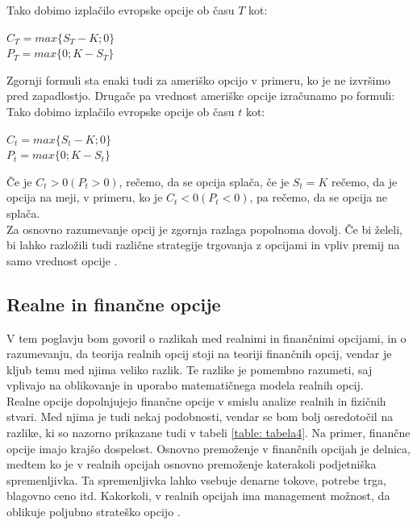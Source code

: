 Tako dobimo izplačilo evropske opcije ob času $T$ kot:
\begin{center}
$C_T = max\{S_T - K; 0\}$\\
$P_T = max\{0; K - S_T\}$
\end{center}  
Zgornji formuli sta enaki tudi za ameriško opcijo v primeru, ko je ne izvršimo pred zapadlostjo. Drugače pa vrednost ameriške opcije izračunamo po formuli:\\
Tako dobimo izplačilo evropske opcije ob času $t$ kot:
\begin{center}
$C_t = max\{S_t - K; 0\}$\\
$P_t = max\{0; K - S_t\}$
\end{center}  
Če je $C_t>0 (P_t>0)$, rečemo, da se opcija splača, če je $S_t=K$ rečemo, da je opcija na meji, v primeru, ko je $C_t<0 (P_t<0)$, pa rečemo, da se opcija ne splača.\\
Za osnovno razumevanje opcij je zgornja razlaga popolnoma dovolj. Če bi želeli, bi lahko razložili tudi različne strategije trgovanja z opcijami in vpliv premij na samo vrednost opcije \cite[str. 54-58]{Kosir}.

\subsection{Realne in finančne opcije}
V tem poglavju bom govoril o razlikah med realnimi in finančnimi opcijami, in o razumevanju, da teorija realnih opcij stoji na teoriji finančnih opcij, vendar je kljub temu med njima veliko razlik. Te razlike je pomembno razumeti, saj vplivajo na oblikovanje in uporabo matematičnega modela realnih opcij. \\

Realne opcije dopolnjujejo finančne opcije v smislu analize realnih in fizičnih stvari. Med njima je tudi nekaj podobnosti, vendar se bom bolj osredotočil na razlike, ki so nazorno prikazane tudi v tabeli \ref{table: tabela4}. Na primer, finančne opcije imajo krajšo dospelost. Osnovno premoženje v finančnih opcijah je delnica, medtem ko je v realnih opcijah osnovno premoženje katerakoli podjetniška spremenljivka. Ta spremenljivka lahko vsebuje denarne tokove, potrebe trga, blagovno ceno itd. Kakorkoli, v realnih opcijah ima management možnost, da oblikuje poljubno strateško opcijo \cite[str. 109, 110]{Mun}.
\pagebreak

